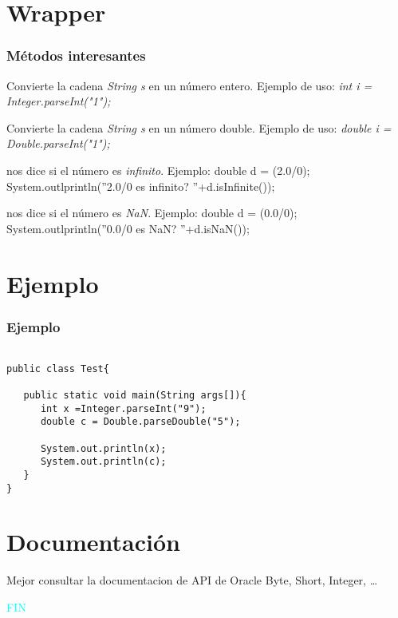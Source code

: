 \documentclass{beamer}
\begin{document}
\section{Wrapper}
\begin{frame}
\frametitle{Métodos interesantes}
\begin{description}[<+->]
\item[static int parseInt(String s)] Convierte la cadena \emph{String s} en un número entero. Ejemplo de uso: \emph{int i = Integer.parseInt("1");}
\item[static double parseDouble(String s)] Convierte la cadena \emph{String s} en un número double. Ejemplo de uso: \emph{double i = Double.parseInt("1");}
\item[boolean isInfinite()] nos dice si el número es \emph{infinito}. Ejemplo: double d = (2.0/0); System.outlprintln(''2.0/0 es infinito? ''+d.isInfinite());
\item[boolean isNaN()] nos dice si el número es \emph{NaN}. Ejemplo: double d = (0.0/0); System.outlprintln(''0.0/0 es NaN? ''+d.isNaN());
\end{description}
\end{frame}
\section{Ejemplo}
\begin{frame}[fragile]
\frametitle{Ejemplo}
\begin{verbatim}

public class Test{ 

   public static void main(String args[]){
      int x =Integer.parseInt("9");
      double c = Double.parseDouble("5");

      System.out.println(x);
      System.out.println(c);
   }
}
\end{verbatim}
\end{frame}

\section{Documentación}
\begin{frame}[fragile]
Mejor consultar la documentacion de API de Oracle Byte, Short, Integer, \dots
\vspace{1cm}
\pause
\begin{center}

\begin{Huge}
\textcolor{cyan}{FIN}
\end{Huge}
\end{center}
\end{frame}
\end{document}
